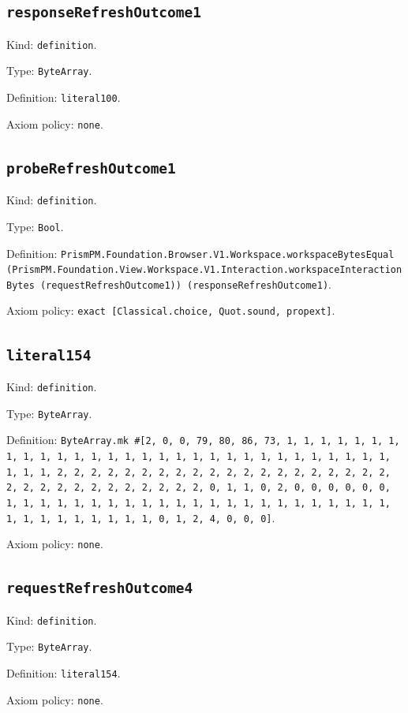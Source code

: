 \documentclass[11pt]{article}
\begin{document}
\subsection*{\texttt{responseRefreshOutcome1}}
\noindent Kind: \texttt{definition}.\par
\noindent Type: \texttt{ByteArray}.\par
\noindent Definition: \texttt{literal100}.\par
\noindent Axiom policy: \texttt{none}.\par
\subsection*{\texttt{probeRefreshOutcome1}}
\noindent Kind: \texttt{definition}.\par
\noindent Type: \texttt{Bool}.\par
\noindent Definition: \texttt{PrismPM.Foundation.Browser.V1.Workspace.workspaceBytesEqual (PrismPM.Foundation.View.Workspace.V1.Interaction.workspaceInteractionBytes (requestRefreshOutcome1)) (responseRefreshOutcome1)}.\par
\noindent Axiom policy: \texttt{exact [Classical.choice, Quot.sound, propext]}.\par
\subsection*{\texttt{literal154}}
\noindent Kind: \texttt{definition}.\par
\noindent Type: \texttt{ByteArray}.\par
\noindent Definition: \texttt{ByteArray.mk \#[2, 0, 0, 79, 80, 86, 73, 1, 1, 1, 1, 1, 1, 1, 1, 1, 1, 1, 1, 1, 1, 1, 1, 1, 1, 1, 1, 1, 1, 1, 1, 1, 1, 1, 1, 1, 1, 1, 1, 1, 2, 2, 2, 2, 2, 2, 2, 2, 2, 2, 2, 2, 2, 2, 2, 2, 2, 2, 2, 2, 2, 2, 2, 2, 2, 2, 2, 2, 2, 2, 2, 2, 0, 1, 1, 0, 2, 0, 0, 0, 0, 0, 0, 1, 1, 1, 1, 1, 1, 1, 1, 1, 1, 1, 1, 1, 1, 1, 1, 1, 1, 1, 1, 1, 1, 1, 1, 1, 1, 1, 1, 1, 1, 1, 1, 0, 1, 2, 4, 0, 0, 0]}.\par
\noindent Axiom policy: \texttt{none}.\par
\subsection*{\texttt{requestRefreshOutcome4}}
\noindent Kind: \texttt{definition}.\par
\noindent Type: \texttt{ByteArray}.\par
\noindent Definition: \texttt{literal154}.\par
\noindent Axiom policy: \texttt{none}.\par
\end{document}
